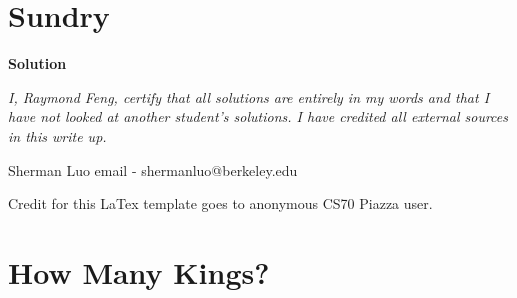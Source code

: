 \documentclass[11pt]{article}
\newcommand*{\Question}[1]{\section{#1}}
\begin{document}
\Question{Sundry} 
\vspace{10pt}
\begin{mdframed} \textbf{Solution} 
\item \textit {I, Raymond Feng, certify that all solutions are entirely in my words and that I have not looked at another student's solutions. I have credited all external sources in this write up.}
\item Sherman Luo email - shermanluo@berkeley.edu
\item Credit for this LaTex template goes to anonymous CS70 Piazza user.
\end{mdframed}
\vfill\pagebreak[3]

\Question{How Many Kings?}
\end{document}
